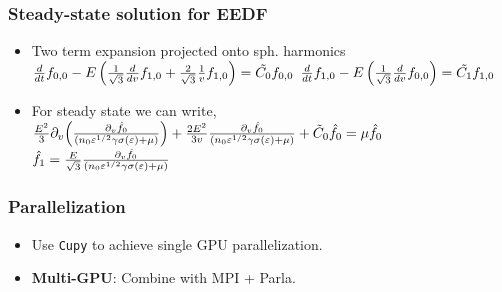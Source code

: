 \documentclass[landscape,archE,fontscale=0.285]{baposter} %
\begin{document}
\begin{poster}
{\begin{multicols}{2}
\subsubsection*{Steady-state solution for EEDF}
\begin{itemize}
  \item Two term expansion projected onto sph. harmonics\\
  $
  \frac{d}{dt} f_{0,0} - E 
  \left( \frac{1}{\sqrt{3}} \frac{d}{dv} f_{1,0} 
  +  \frac{2}{\sqrt{3}} \frac{1}{v} f_{1,0} \right) = \tilde{C_0} f_{0,0}
  $
  $\frac{d}{dt} f_{1,0} - E 
  \left( \frac{1}{\sqrt{3}} \frac{d}{dv} f_{0,0} \right) =  \tilde{C_1} f_{1,0}
	$
  \item For steady state we can write, \\
    $\frac{E^2}{3} \partial_{v} \of{\frac{\partial_v \hat f_0}{(n_0 \varepsilon^{1/2}\gamma \sigma\of{\varepsilon} + \mu)}} + \frac{2E^2}{3v} \frac{\partial_v \hat{f_0}}{(n_0 \varepsilon^{1/2}\gamma \sigma\of{\varepsilon} + \mu)} + \tilde C_0 \hat{f_0} = \mu \hat{f_0}$\\
    $\hat{f_1} = \frac{E}{\sqrt{3}} \frac{\partial_{v}\hat{f_0}}{(n_0 \varepsilon^{1/2}\gamma \sigma\of{\varepsilon} + \mu)}$

\end{itemize}
\subsubsection*{Parallelization}
\begin{itemize}
  \item Use \texttt{Cupy} to achieve single GPU parallelization. 
  \item \textbf{Multi-GPU}: Combine with MPI + Parla.  
\end{itemize}
\end{multicols}
}






\end{poster}
\end{document}
